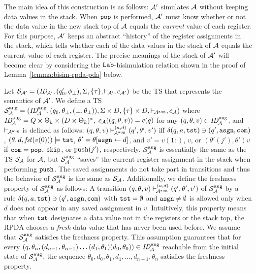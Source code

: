 The main idea of this construction is as follows:
${\cal A}'$ simulates ${\cal A}$ without keeping data values in
the stack.
When $\mathtt{pop}$ is performed,
${\cal A}'$ must know whether or not
the data value in the new stack top of ${\cal A}$
equals the \emph{current} value of each register.
For this purpose,
${\cal A}'$ keeps an abstract ``history'' of
the register assignments in the stack,
which tells whether
each of the data values in the stack of ${\cal A}$ equals
the current value of each register.
The precise meanings of the stack of ${\cal A}'$
will become clear
by considering the $\mathtt{Lab}$-bisimulation relation
shown in the proof of Lemma~\ref{lemma:bisim-rpda-pda} below.

Let %
${\cal S}_{{\cal A}'}=(\mathit{ID}_{\!{\cal A}'},(q'_0,\phi_{\bot}),\allowbreak
\Sigma,\{\tau\},{\vdash_{\!{\cal A}'}},c_{{\cal A}'})$ be the TS
that represents the semantics of ${\cal A}'$.
We define a TS
${\cal S}_{{\cal A}}^{\mathrm{aug}}=
(\mathit{ID}_{\!{\cal A}}^{\mathrm{aug}},(q_0,\theta_{\bot},(\bot,\theta_{\bot})),
\Sigma\times D,\{\tau\}\times D,{\vdash_{\!{\cal A}^{\mathrm{aug}}}},c_{{\cal A}})$
where
$\mathit{ID}_{\!{\cal A}}^{\mathrm{aug}}=Q\times\Theta_k\times(D\times\Theta_k)^*$,
$c_{{\cal A}}((q,\theta,v))=c(q)$ for
any $(q,\theta,v)\in\mathit{ID}_{\!{\cal A}}^{\mathrm{aug}}$,
and $\vdash_{\!{\cal A}^{\mathrm{aug}}}$ is defined as follows:
$(q,\theta,v)\vdash_{\!{\cal A}^{\mathrm{aug}}}^{(a,d)}(q',\theta',v')$
iff
$\delta(q,a,\mathtt{tst})\ni (q',\mathtt{asgn},\mathtt{com})$,
$(\theta,d,\mathit{fst}(v(0)))\models\mathtt{tst}$,
$\theta'=\theta[\mathtt{asgn}\gets d]$, and
$v'= v(1{:})$, $v$, or $(\theta'(j'),\theta')v$
if $\mathtt{com}=\mathtt{pop}$, $\mathtt{skip}$, or $\mathtt{push}(j')$, respectively.
${\cal S}_{{\cal A}}^{\mathrm{aug}}$ is essentially
the same as the TS ${\cal S}_{{\cal A}}$ for ${\cal A}$,
but ${\cal S}_{{\cal A}}^{\mathrm{aug}}$
``saves'' the current register assignment in the stack
when performing $\mathtt{push}$.
The saved assignments do not take part in transitions and thus
the behavior of
${\cal S}_{{\cal A}}^{\mathrm{aug}}$ is the same as ${\cal S}_{{\cal A}}$.
Additionally,
we define the freshness property of ${\cal S}_{{\cal A}}^{\mathrm{aug}}$
as follows:
A transition
$(q,\theta,v)\vdash_{\!{\cal A}^{\mathrm{aug}}}^{(a,d)}(q',\theta',v')$
of ${\cal S}_{{\cal A}}^{\mathrm{aug}}$
by a rule
$\delta(q,a,\mathtt{tst})\ni (q',\mathtt{asgn},\mathtt{com})$ with $\mathtt{tst}=\emptyset$ and
$\mathtt{asgn}\ne\emptyset$ is allowed
only when $d$ does not appear in any saved assignment in $v$.
Intuitively,
this property means that when $\mathtt{tst}$ designates a data value not in
the registers or the stack top,
the RPDA chooses a \emph{fresh} data value that has never been used before.
We assume that ${\cal S}_{{\cal A}}^{\mathrm{aug}}$ satisfies the freshness property.
This assumption guarantees that
for every
$(q,\theta_n,(d_{n-1},\theta_{n-1})\ldots(d_1,\theta_1)(d_0,\theta_0))
\in\mathit{ID}_{\!{\cal A}}^{\mathrm{aug}}$ reachable from the initial state of
${\cal S}_{{\cal A}}^{\mathrm{aug}}$,
the sequence
$\theta_0,d_0,\theta_1,d_1,\ldots,d_{n-1},\theta_n$ satisfies
the freshness property.

